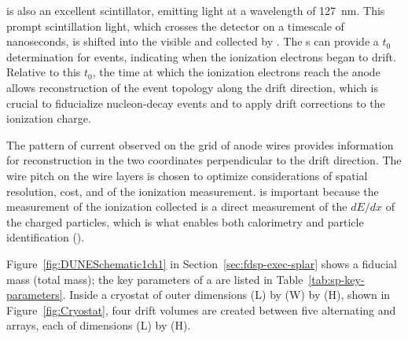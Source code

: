  is also an excellent scintillator, emitting  light at a wavelength of \SI{127}{\nano\meter}. This prompt scintillation light, which crosses the detector on a timescale of nanoseconds, is shifted into the visible and collected by . The s can provide a $t_{0}$ determination for events, indicating when the ionization electrons began to drift. Relative to this $t_{0}$, the time at which the ionization electrons reach the anode allows reconstruction of the event topology along the drift direction, which is crucial to fiducialize nucleon-decay events and to apply drift corrections to the ionization charge.

The pattern of current observed on the grid of anode wires provides information for reconstruction in the two coordinates perpendicular to the drift direction. The wire pitch on the wire layers is chosen to optimize considerations of  spatial resolution, cost, and  of the ionization measurement.  is important because the measurement of the ionization collected is a direct measurement of the $dE/dx$ of the charged particles, which is what enables both calorimetry and particle identification ().

Figure~\ref{fig:DUNESchematic1ch1} in Section~\ref{sec:fdsp-exec-splar} shows a \nominalmodsize fiducial mass  (\larmass total mass); the key parameters of a  are listed in Table~\ref{tab:sp-key-parameters}. Inside a cryostat of outer dimensions \cryostatlen (L) by \cryostatwdth (W) by \cryostatht{} (H), shown in Figure~\ref{fig:Cryostat}, four \spmaxdrift drift volumes are created between five alternating  and  arrays, each of dimensions \sptpclen (L) by \tpcheight (H).


